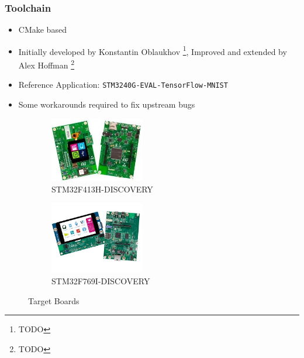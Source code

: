\documentclass{tum-presentation}
\begin{document}
\begin{frame}
  \frametitle{Toolchain}

\begin{itemize}
    \item CMake based
    \item Initially developed by Konstantin Oblaukhov \footnote{TODO}, Improved and extended by Alex Hoffman \footnote{TODO}
    \item Reference Application: \lstinline{STM3240G-EVAL-TensorFlow-MNIST}
    \item Some workarounds required to fix upstream bugs
\end{itemize}

\begin{figure}[h]
     \centering
     \begin{subfigure}[b]{0.49\textwidth}
         \centering
         \includegraphics[width=0.45\textwidth]{figures/disco_f413h.jpg}
         \caption{STM32F413H-DISCOVERY}
         \label{fig:stm32f4}
     \end{subfigure}
     \hfill
     \begin{subfigure}[b]{0.49\textwidth}
         \centering
         \includegraphics[width=0.45\textwidth]{figures/disco_f769i.jpg}
         \caption{STM32F769I-DISCOVERY}
         \label{fig:stm32f7}
     \end{subfigure}
        \caption{Target Boards}
        \label{fig:boards}
\end{figure}

\end{frame}
\end{document}
